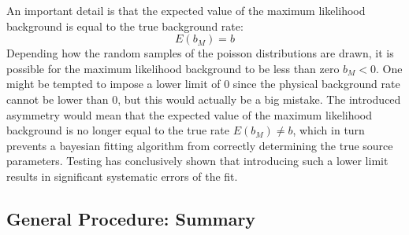\documentclass{report}
\begin{document}
An important detail is that the expected value of the maximum likelihood background is equal to the true background rate:
\begin{equation}
  E(b_M) = b
\end{equation}
Depending how the random samples of the poisson distributions are drawn, it is possible for the maximum likelihood background to be less than zero $b_M<0$. One might be tempted to impose a lower limit of 0 since the physical background rate cannot be lower than 0, but this would actually be a big mistake. The introduced asymmetry would mean that the expected value of the maximum likelihood background is no longer equal to the true rate $E(b_M) \neq b$, which in turn prevents a bayesian fitting algorithm from correctly determining the true source parameters. Testing has conclusively shown that introducing such a lower limit results in significant systematic errors of the fit.


\subsection{General Procedure: Summary}
\end{document}

